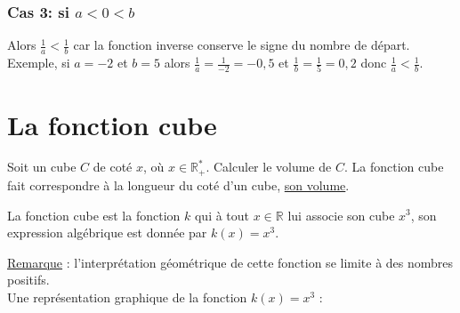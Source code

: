 \documentclass[french]{book}
\begin{document}
\subsubsection*{Cas 3: si $a<0<b$}
Alors $\frac{1}{a} < \frac{1}{b}$ car la fonction inverse conserve le signe du nombre de départ. Exemple, si $a=-2$ et $b=5$ alors $\frac{1}{a}=\frac{1}{-2}=-0,5$ et $\frac{1}{b}=\frac{1}{5}=0,2$ donc $\frac{1}{a} < \frac{1}{b}$.

\section{La fonction cube}

Soit un cube $C$ de coté $x$, où $x \in \mathbb{R}_+^*$. Calculer le volume de $C$.
La fonction cube fait correspondre à la longueur du coté d'un cube, \underline{son volume}.

\begin{defn}
La fonction cube est la fonction $k$ qui à tout $x \in \mathbb{R}$ lui associe son cube $x^3$, son expression algébrique est donnée par $k(x)=x^3$.\\
\end{defn}

\underline{Remarque} : l'interprétation géométrique de cette fonction se limite à des nombres positifs.\\


Une représentation graphique de la fonction $k(x)=x^3$ :

\begin{center}
\end{center}
\end{document}
